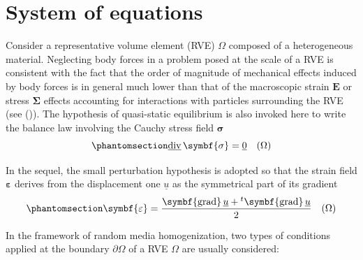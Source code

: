\documentclass[
  a4paper,
  numbers=noendperiod,
  DIV=12]{scrreprt}
\newcommand{\uu}[1]{{\symbf{{#1}}}}
\newcommand{\uv}[1]{{\underline{{#1}}}}
\newcommand{\eps}{{\uu{{\varepsilon}}}}
\newcommand{\E}{{\uu{{E}}}}
\newcommand{\sig}{{\uu{{\sigma}}}}
\newcommand{\Sig}{{\uu{{\Sigma}}}}
\newcommand{\trans}[1]{{{}^{t}{#1}}}
\DeclareMathOperator{\divu}{\uv{div}}
\DeclareMathOperator{\graduu}{\uu{grad}}
\begin{document}
\section{System of equations}\label{sec-basics_elas_sys_eq}

Consider a representative volume element (RVE) \(\Omega\) composed of a
heterogeneous material. Neglecting body forces in a problem posed at the
scale of a RVE is consistent with the fact that the order of magnitude
of mechanical effects induced by body forces is in general much lower
than that of the macroscopic strain \(\E\) or stress \(\Sig\) effects
accounting for interactions with particles surrounding the RVE (see
()). The hypothesis of
quasi-static equilibrium is also invoked here to write the balance law
involving the Cauchy stress field \(\sig\)
\begin{equation}\protect\phantomsection\label{eq-divsigma}{
\divu{\sig}=\uv{0} \quad(\Omega)
}\end{equation}

In the sequel, the small perturbation hypothesis is adopted so that the
strain field \(\eps\) derives from the displacement one \(\uv{u}\) as
the symmetrical part of its gradient
\begin{equation}\protect\phantomsection\label{eq-epsgradu}{
\eps=\frac{\graduu{\uv{u}}+\trans{\graduu{\uv{u}}}}{2} \quad(\Omega)
}\end{equation}

In the framework of random media homogenization, two types of conditions
applied at the boundary \(\partial\Omega\) of a RVE \(\Omega\) are
usually considered:
\end{document}
